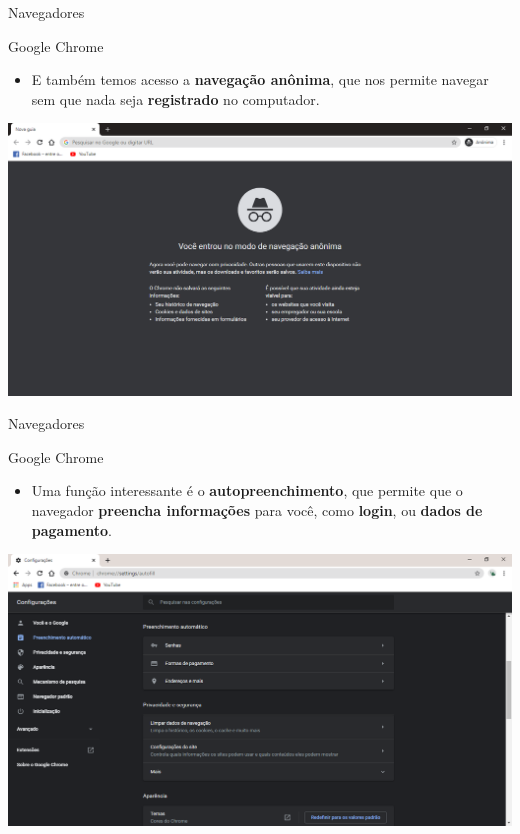 \begin{frame}{Navegadores}
	\begin{block}{Google Chrome}
		\begin{itemize}
			\item E também temos acesso a \textbf{navegação anônima}, que nos permite navegar sem que nada seja \textbf{registrado} no computador.
		\end{itemize}
	\end{block}
	
	\centering
	\includegraphics[width=0.9\linewidth]{Figuras/Ch03/fig8.7}
\end{frame}


\begin{frame}{Navegadores}
	\begin{block}{Google Chrome}
		\begin{itemize}
			\item Uma função interessante é o \textbf{autopreenchimento}, que permite que o navegador \textbf{preencha informações} para você, como \textbf{login}, ou \textbf{dados de pagamento}.
		\end{itemize}
	\end{block}
	
	\centering
	\includegraphics[width=0.8\linewidth]{Figuras/Ch03/fig8.9}
\end{frame}


